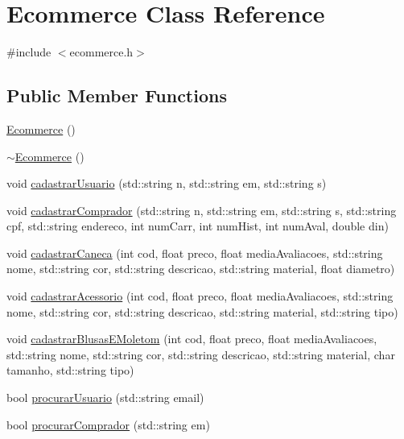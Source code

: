 \hypertarget{class_ecommerce}{}\section{Ecommerce Class Reference}
\label{class_ecommerce}


{\ttfamily \#include $<$ecommerce.\+h$>$}

\subsection*{Public Member Functions}
\begin{DoxyCompactItemize}
\item 
\hyperlink{class_ecommerce_a3a1e67dca201bf8b5729799c521e67da}{Ecommerce} ()
\item 
\hyperlink{class_ecommerce_ac2a64ea1d418ea95c0d2b604f09cb931}{$\sim$\+Ecommerce} ()
\item 
void \hyperlink{class_ecommerce_ac43526249f4aefbee0c8e4fd5c6f45f2}{cadastrar\+Usuario} (std\+::string n, std\+::string em, std\+::string s)
\item 
void \hyperlink{class_ecommerce_a6800ded87479fc4ef9aa162e4cb5e6a9}{cadastrar\+Comprador} (std\+::string n, std\+::string em, std\+::string s, std\+::string cpf, std\+::string endereco, int num\+Carr, int num\+Hist, int num\+Aval, double din)
\item 
void \hyperlink{class_ecommerce_ad47414b6fefec3afe06204db4e22f23a}{cadastrar\+Caneca} (int cod, float preco, float media\+Avaliacoes, std\+::string nome, std\+::string cor, std\+::string descricao, std\+::string material, float diametro)
\item 
void \hyperlink{class_ecommerce_af37509f24042326e7a4d7ef3acc9b9ac}{cadastrar\+Acessorio} (int cod, float preco, float media\+Avaliacoes, std\+::string nome, std\+::string cor, std\+::string descricao, std\+::string material, std\+::string tipo)
\item 
void \hyperlink{class_ecommerce_a479cdb4dd12a289222a2bced3364fba9}{cadastrar\+Blusas\+E\+Moletom} (int cod, float preco, float media\+Avaliacoes, std\+::string nome, std\+::string cor, std\+::string descricao, std\+::string material, char tamanho, std\+::string tipo)
\item 
bool \hyperlink{class_ecommerce_a9f64f83f2837b0962add2ca223ccca93}{procurar\+Usuario} (std\+::string email)
\item 
bool \hyperlink{class_ecommerce_aff2a4db0aedf0f191269426cd76dac53}{procurar\+Comprador} (std\+::string em)

\end{DoxyCompactItemize}
